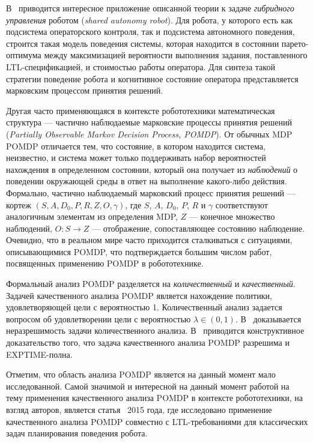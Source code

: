 \documentclass[conference]{IEEEtran}
\begin{document}
В~\cite{fu2014pareto} приводится интересное приложение описанной теории к задаче 
\textit{гибридного управления} роботом (\textit{shared autonomy robot}). Для 
робота, у которого есть как подсистема операторского контроля, так и подсистема 
автономного поведения, строится такая модель поведения системы, которая находится 
в состоянии парето-оптимума между максимизацией вероятности выполнения задания, 
поставленного LTL-спецификацией, и стоимостью работы оператора. Для синтеза 
такой стратегии поведение робота и когнитивное состояние оператора представляется 
марковским процессом принятия решений.

Другая часто применяющаяся в контексте робототехники математическая структура --- 
частично наблюдаемые марковские процессы принятия решений 
(\textit{Partially Observable Markov Decision Process, POMDP}). От обычных MDP POMDP 
отличается тем, что состояние, в котором находится система, неизвестно, и система 
может только поддерживать набор вероятностей нахождения в определенном состоянии, 
который она получает из \textit{наблюдений} о поведении окружающей среды в ответ на 
выполнение какого-либо действия. Формально, частично наблюдаемый марковский 
процесс принятия решений --- кортеж $(S, A, D_0, P, R, Z, O, \gamma)$, 
где $S$, $A$, $D_0$, $P$, $R$ и $\gamma$ соответствуют аналогичным элементам 
из определения MDP, $Z$ --- конечное множество наблюдений, $O: S\rightarrow{}Z$ 
--- отображение, сопоставляющее состоянию наблюдение. Очевидно, что в реальном 
мире часто приходится сталкиваться с ситуациями, описывающимися POMDP, что 
подтверждается большим числом работ, посвященных применению POMDP в робототехнике.

Формальный анализ POMDP разделяется на \textit{количественный} и \textit{качественный}. 
Задачей качественного анализа POMDP является нахождение политики, удовлетворяющей 
цели с вероятностью 1. Количественный анализ задается вопросом об удовлетворении 
цели с вероятностью $\lambda \in (0,1)$. В~\cite{baier2012probabilistic} доказывается 
неразрешимость задачи количественного анализа. В~\cite{chatterjee2013decidable} 
приводится конструктивное доказательство того, что задача качественного анализа 
POMDP разрешима и EXPTIME-полна.

Отметим, что область анализа POMDP является на данный момент мало исследованной. 
Самой значимой и интересной на данный момент работой на тему применения 
качественного анализа POMDP в контексте робототехники, на взгляд авторов, 
является статья~\cite{chatterjee2014qualitative} 2015 года, где исследовано 
применение качественного анализа POMDP совместно с LTL-требованиями для 
классических задач планирования поведения робота.
\end{document}
